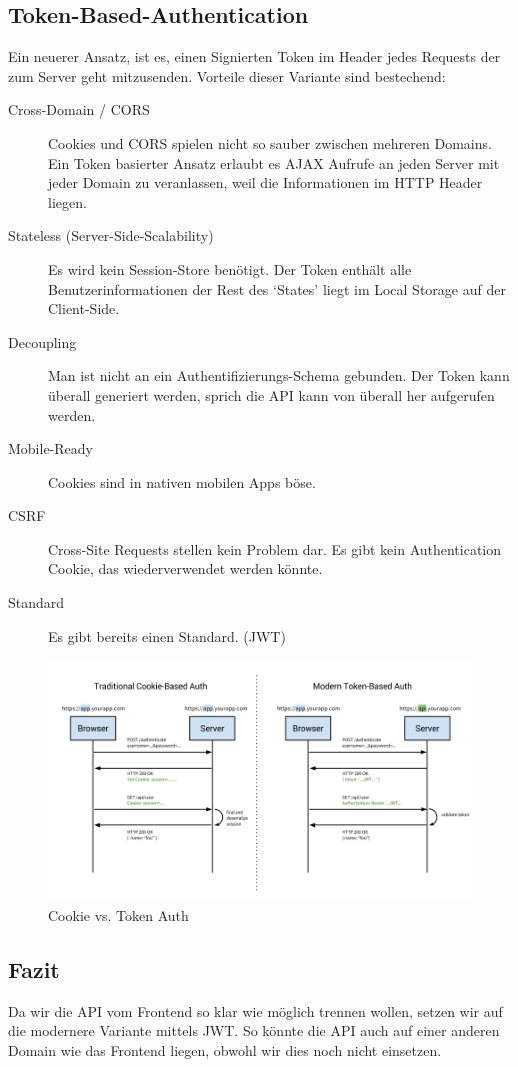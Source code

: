 \subsection{Token-Based-Authentication}
Ein neuerer Ansatz, ist es, einen Signierten Token im Header jedes Requests der zum Server geht mitzusenden. Vorteile dieser Variante sind bestechend:
\begin{description}
  \item[Cross-Domain / CORS]
  Cookies und CORS spielen nicht so sauber zwischen mehreren Domains. Ein Token basierter Ansatz erlaubt es AJAX Aufrufe an jeden Server mit jeder Domain zu veranlassen, weil die Informationen im HTTP Header liegen.
  \item[Stateless (Server-Side-Scalability)]Es wird kein Session-Store benötigt. Der Token enthält alle Benutzerinformationen der Rest des `States' liegt im Local Storage auf der Client-Side.
  \item[Decoupling] Man ist nicht an ein Authentifizierungs-Schema gebunden. Der Token kann überall generiert werden, sprich die API kann von überall her aufgerufen werden.
  \item[Mobile-Ready]Cookies sind in nativen mobilen Apps böse.
  \item[CSRF]Cross-Site Requests stellen kein Problem dar. Es gibt kein Authentication Cookie, das wiederverwendet werden könnte.
  \item[Standard]Es gibt bereits einen Standard. (\gls{JWT})
\end{description}
\begin{figure}[H]
    \centering
    \includegraphics[width=\linewidth]{fig/cookie-token-auth}
    \caption{Cookie vs. Token Auth}
    \label{fig:pd:cookie-token-auth}
\end{figure}
\subsection{Fazit}
\begin{decision}
Da wir die API vom Frontend so klar wie möglich trennen wollen, setzen wir auf die modernere Variante mittels \acs{JWT}. So könnte die API auch auf einer anderen Domain wie das Frontend liegen, obwohl wir dies noch nicht einsetzen.
\end{decision}